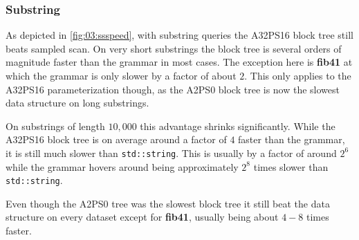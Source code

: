\documentclass{scrartcl}
\begin{document}
\subsubsection{Substring}

As depicted in \cref{fig:03:ssspeed}, with substring queries the A32PS16 block tree still beats sampled scan.
On very short substrings the block tree is several orders of magnitude faster than the grammar in most cases.
The exception here is \textbf{fib41} at which the grammar is only slower by a factor of about $2$.
This only applies to the A32PS16 parameterization though, as the A2PS0 block tree is now the slowest data structure on long substrings.

On substrings of length $10,000$ this advantage shrinks significantly.
While the A32PS16 block tree is on average around a factor of $4$ faster than the grammar,
it is still much slower than \texttt{std::string}.
This is usually by a factor of around $2^6$ while the grammar hovers around being approximately $2^8$
times slower than \texttt{std::string}.

Even though the A2PS0 tree was the slowest block tree it still beat the \lzend{} data structure on every dataset except for \textbf{fib41},
usually being about $4-8$ times faster.
\end{document}
